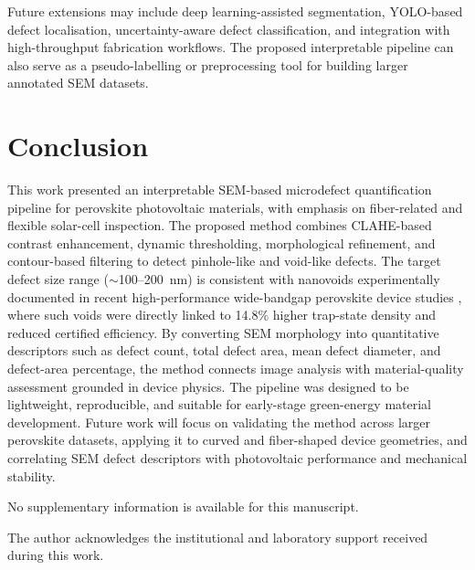 \documentclass[pdflatex,sn-mathphys-num,iicol]{sn-jnl}
\theoremstyle{thmstyleone}
\theoremstyle{thmstyletwo}
\theoremstyle{thmstylethree}
\begin{document}
Future extensions may include deep learning-assisted segmentation,
YOLO-based defect localisation, uncertainty-aware defect
classification, and integration with high-throughput fabrication
workflows. The proposed interpretable pipeline can also serve as a
pseudo-labelling or preprocessing tool for building larger annotated
SEM datasets.


\section{Conclusion}\label{sec:conclusion}

This work presented an interpretable SEM-based microdefect
quantification pipeline for perovskite photovoltaic materials, with
emphasis on fiber-related and flexible solar-cell inspection. The
proposed method combines CLAHE-based contrast enhancement, dynamic
thresholding, morphological refinement, and contour-based filtering
to detect pinhole-like and void-like defects. The target defect
size range ($\sim$100--200~nm) is consistent with nanovoids
experimentally documented in recent high-performance wide-bandgap
perovskite device studies \cite{chang2026}, where such voids were
directly linked to 14.8\% higher trap-state density and reduced
certified efficiency. By converting SEM morphology into quantitative
descriptors such as defect count, total defect area, mean defect
diameter, and defect-area percentage, the method connects image
analysis with material-quality assessment grounded in device physics.
The pipeline was designed to be lightweight, reproducible, and
suitable for early-stage green-energy material development. Future
work will focus on validating the method across larger perovskite
datasets, applying it to curved and fiber-shaped device geometries,
and correlating SEM defect descriptors with photovoltaic performance
and mechanical stability.


\backmatter

No supplementary information is available for this manuscript.

The author acknowledges the institutional and laboratory support
received during this work.
\end{document}
